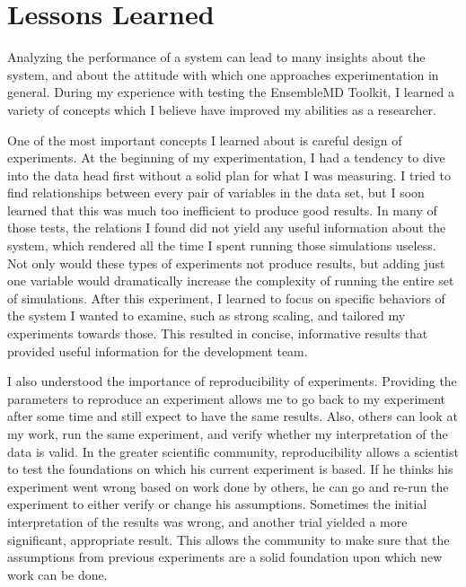 \documentclass[]{article}
\begin{document}
\section{Lessons Learned}
	Analyzing the performance of a system can lead to many insights about the system, and about the attitude with which one approaches experimentation in general. During my experience with testing the EnsembleMD Toolkit, I learned a variety of concepts which I believe have improved my abilities as a researcher.

	One of the most important concepts I learned about is careful design of experiments. At the beginning of my experimentation, I  had a tendency to dive into the data head first without a solid plan for what I was measuring. I tried to find relationships between every pair of variables in the data set, but I soon learned that this was much too inefficient to produce good results. In many of those tests, the relations I found did not yield any useful information about the system, which rendered all the time I spent running those simulations useless. Not only would these types of experiments not produce results, but adding just one variable would dramatically increase the complexity of running the entire set of simulations. After this experiment, I learned to focus on specific behaviors of the system I wanted to examine, such as strong scaling, and tailored my experiments towards those. This resulted in concise, informative results that provided useful information for the development team.

	I also understood the importance of reproducibility of experiments. Providing the parameters to reproduce an experiment allows me to go back to my experiment after some time and still expect to have the same results. Also, others can look at my work, run the same experiment, and verify whether my interpretation of the data is valid. In the greater scientific community, reproducibility allows a scientist to test the foundations on which his current experiment is based. If he thinks his experiment went wrong based on work done by others, he can go and re-run the experiment to either verify or change his assumptions. Sometimes the initial interpretation of the results was wrong, and another trial yielded a more significant, appropriate result. This allows the community to make sure that the assumptions from previous experiments are a solid foundation upon which new work can be done.
\end{document}
